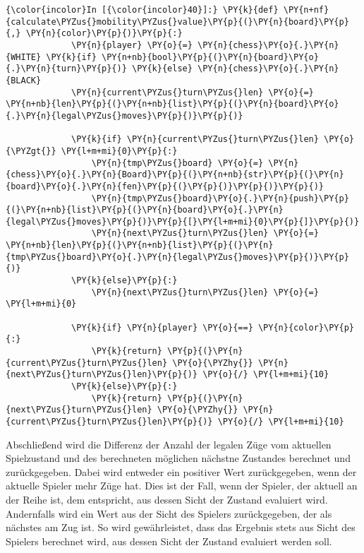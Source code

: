     \begin{Verbatim}[commandchars=\\\{\}]
{\color{incolor}In [{\color{incolor}40}]:} \PY{k}{def} \PY{n+nf}{calculate\PYZus{}mobility\PYZus{}value}\PY{p}{(}\PY{n}{board}\PY{p}{,} \PY{n}{color}\PY{p}{)}\PY{p}{:}
             \PY{n}{player} \PY{o}{=} \PY{n}{chess}\PY{o}{.}\PY{n}{WHITE} \PY{k}{if} \PY{n+nb}{bool}\PY{p}{(}\PY{n}{board}\PY{o}{.}\PY{n}{turn}\PY{p}{)} \PY{k}{else} \PY{n}{chess}\PY{o}{.}\PY{n}{BLACK}
             \PY{n}{current\PYZus{}turn\PYZus{}len} \PY{o}{=} \PY{n+nb}{len}\PY{p}{(}\PY{n+nb}{list}\PY{p}{(}\PY{n}{board}\PY{o}{.}\PY{n}{legal\PYZus{}moves}\PY{p}{)}\PY{p}{)}
         
             \PY{k}{if} \PY{n}{current\PYZus{}turn\PYZus{}len} \PY{o}{\PYZgt{}} \PY{l+m+mi}{0}\PY{p}{:}
                 \PY{n}{tmp\PYZus{}board} \PY{o}{=} \PY{n}{chess}\PY{o}{.}\PY{n}{Board}\PY{p}{(}\PY{n+nb}{str}\PY{p}{(}\PY{n}{board}\PY{o}{.}\PY{n}{fen}\PY{p}{(}\PY{p}{)}\PY{p}{)}\PY{p}{)}
                 \PY{n}{tmp\PYZus{}board}\PY{o}{.}\PY{n}{push}\PY{p}{(}\PY{n+nb}{list}\PY{p}{(}\PY{n}{board}\PY{o}{.}\PY{n}{legal\PYZus{}moves}\PY{p}{)}\PY{p}{[}\PY{l+m+mi}{0}\PY{p}{]}\PY{p}{)}
                 \PY{n}{next\PYZus{}turn\PYZus{}len} \PY{o}{=} \PY{n+nb}{len}\PY{p}{(}\PY{n+nb}{list}\PY{p}{(}\PY{n}{tmp\PYZus{}board}\PY{o}{.}\PY{n}{legal\PYZus{}moves}\PY{p}{)}\PY{p}{)}
             \PY{k}{else}\PY{p}{:}
                 \PY{n}{next\PYZus{}turn\PYZus{}len} \PY{o}{=} \PY{l+m+mi}{0}
             
             \PY{k}{if} \PY{n}{player} \PY{o}{==} \PY{n}{color}\PY{p}{:}
                 \PY{k}{return} \PY{p}{(}\PY{n}{current\PYZus{}turn\PYZus{}len} \PY{o}{\PYZhy{}} \PY{n}{next\PYZus{}turn\PYZus{}len}\PY{p}{)} \PY{o}{/} \PY{l+m+mi}{10}
             \PY{k}{else}\PY{p}{:}
                 \PY{k}{return} \PY{p}{(}\PY{n}{next\PYZus{}turn\PYZus{}len} \PY{o}{\PYZhy{}} \PY{n}{current\PYZus{}turn\PYZus{}len}\PY{p}{)} \PY{o}{/} \PY{l+m+mi}{10}
\end{Verbatim}

    Abschließend wird die Differenz der Anzahl der legalen Züge vom
aktuellen Spielzustand und des berechneten möglichen nächstne Zustandes
berechnet und zurückgegeben. Dabei wird entweder ein positiver Wert
zurückgegeben, wenn der aktuelle Spieler mehr Züge hat. Dies ist der
Fall, wenn der Spieler, der aktuell an der Reihe ist, dem entspricht,
aus dessen Sicht der Zustand evaluiert wird. Andernfalls wird ein Wert
aus der Sicht des Spielers zurückgegeben, der als nächstes am Zug ist.
So wird gewährleistet, dass das Ergebnis stets aus Sicht des Spielers
berechnet wird, aus dessen Sicht der Zustand evaluiert werden soll.

